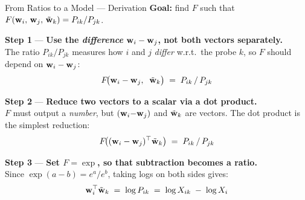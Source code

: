\documentclass[11pt,aspectratio=169,professionalfonts]{beamer}
\begin{document}
\begin{frame}{From Ratios to a Model --- Derivation}
  \textbf{Goal:} find $F$ such that
  $F(\mathbf{w}_i,\, \mathbf{w}_j,\, \tilde{\mathbf{w}}_k) = P_{ik}/P_{jk}$.

  \vspace{6pt}
  \textcolor{CourseBlue}{\textbf{Step 1}} --- \textbf{Use the \emph{difference} $\mathbf{w}_i - \mathbf{w}_j$, not both vectors separately.}\\[2pt]
  The ratio $P_{ik}/P_{jk}$ measures how $i$ and $j$ \emph{differ} w.r.t.\ the probe $k$, so $F$ should depend on $\mathbf{w}_i - \mathbf{w}_j$:
  \vspace{-4pt}
  \[ F\!\bigl(\mathbf{w}_i - \mathbf{w}_j,\;\; \tilde{\mathbf{w}}_k\bigr) \;=\; P_{ik}\,/\,P_{jk} \]

  \vspace{-6pt}
  \textcolor{CourseBlue}{\textbf{Step 2}} --- \textbf{Reduce two vectors to a scalar via a dot product.}\\[2pt]
  $F$ must output a \emph{number}, but $(\mathbf{w}_i{-}\mathbf{w}_j)$ and $\tilde{\mathbf{w}}_k$ are vectors.  The dot product is the simplest reduction:
  \vspace{-4pt}
  \[ F\!\bigl((\mathbf{w}_i - \mathbf{w}_j)^\top \tilde{\mathbf{w}}_k\bigr) \;=\; P_{ik}\,/\,P_{jk} \]

  \vspace{-6pt}
  \textcolor{CourseBlue}{\textbf{Step 3}} --- \textbf{Set $F = \exp$, so that subtraction becomes a ratio.}\\[2pt]
  Since $\exp(a-b) = e^a/e^b$, taking logs on both sides gives:
  \vspace{-4pt}
  \[ \mathbf{w}_i^\top \tilde{\mathbf{w}}_k \;=\; \log P_{ik} \;=\; \log X_{ik} \;-\; \log X_i \]
\end{frame}
%
%
\end{document}
